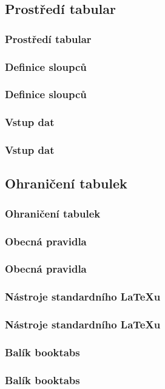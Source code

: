 \subsection{Prostředí tabular}
\begin{frame}
	\frametitle{Prostředí tabular}
	\UnderConstruction
\end{frame}


\subsubsection{Definice sloupců}
\begin{frame}
	\frametitle{Definice sloupců}
	\UnderConstruction
\end{frame}


\subsubsection{Vstup dat}
\begin{frame}
	\frametitle{Vstup dat}
	\UnderConstruction
\end{frame}


\subsection{Ohraničení tabulek}
\begin{frame}
	\frametitle{Ohraničení tabulek}
	\UnderConstruction
\end{frame}


\subsubsection{Obecná pravidla}
\begin{frame}
	\frametitle{Obecná pravidla}
	\UnderConstruction
\end{frame}


\subsubsection{Nástroje standardního \LaTeX{}u}
\begin{frame}
	\frametitle{Nástroje standardního \LaTeX{}u}
	\UnderConstruction
\end{frame}


\subsubsection{Balík booktabs}
\begin{frame}
	\frametitle{Balík booktabs}
	\UnderConstruction
\end{frame}


